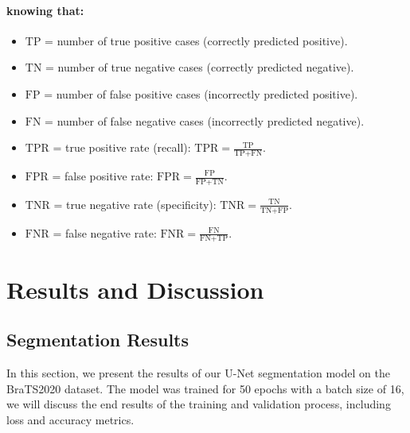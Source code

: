 \begin{itemize}
        \paragraph{knowing that:}
        \begin{itemize}
          \item \(\text{TP}\) = number of true positive cases (correctly predicted positive).
          \item \(\text{TN}\) = number of true negative cases (correctly predicted negative).
          \item \(\text{FP}\) = number of false positive cases (incorrectly predicted positive).
          \item \(\text{FN}\) = number of false negative cases (incorrectly predicted negative).
          \item \(\text{TPR}\) = true positive rate (recall): \(\text{TPR} = \frac{\text{TP}}{\text{TP} + \text{FN}}\).
          \item \(\text{FPR}\) = false positive rate: \(\text{FPR} = \frac{\text{FP}}{\text{FP} + \text{TN}}\).
          \item \(\text{TNR}\) = true negative rate (specificity): \(\text{TNR} = \frac{\text{TN}}{\text{TN} + \text{FP}}\).
          \item \(\text{FNR}\) = false negative rate: \(\text{FNR} = \frac{\text{FN}}{\text{FN} + \text{TP}}\).
        \end{itemize}

\end{itemize}




\section{Results and Discussion}
\subsection{Segmentation Results}
\label{sec:segmentation-results}
In this section, we present the results of our U-Net segmentation model on the BraTS2020 dataset. The model was trained for 50 epochs with a batch size of 16, we will discuss the end results of the training and validation process, including loss and accuracy metrics.

